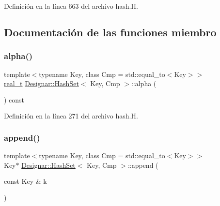 Definición en la línea 663 del archivo hash.\+H.



\subsection{Documentación de las funciones miembro}
\mbox{\label{class_designar_1_1_hash_set_a83376ba0b923d00ffbe1d12c093bc2ae}} 
\subsubsection{\texorpdfstring{alpha()}{alpha()}}
{\footnotesize\ttfamily template$<$typename Key, class Cmp = std\+::equal\+\_\+to$<$\+Key$>$$>$ \\
\hyperlink{namespace_designar_aca2c32af26808dbec1f3a3071fad25ce}{real\+\_\+t} \hyperlink{class_designar_1_1_hash_set}{Designar\+::\+Hash\+Set}$<$ Key, Cmp $>$\+::alpha (\begin{DoxyParamCaption}{ }\end{DoxyParamCaption}) const\hspace{0.3cm}{\ttfamily [inline]}}



Definición en la línea 271 del archivo hash.\+H.

\mbox{\label{class_designar_1_1_hash_set_a6ce31d6797f5f864b9a6906b6a1b9eb6}} 
\subsubsection{\texorpdfstring{append()}{append()}\hspace{0.1cm}{\footnotesize\ttfamily [1/2]}}
{\footnotesize\ttfamily template$<$typename Key, class Cmp = std\+::equal\+\_\+to$<$\+Key$>$$>$ \\
Key$\ast$ \hyperlink{class_designar_1_1_hash_set}{Designar\+::\+Hash\+Set}$<$ Key, Cmp $>$\+::append (\begin{DoxyParamCaption}\item[{const Key \&}]{k }\end{DoxyParamCaption})\hspace{0.3cm}{\ttfamily [inline]}}



